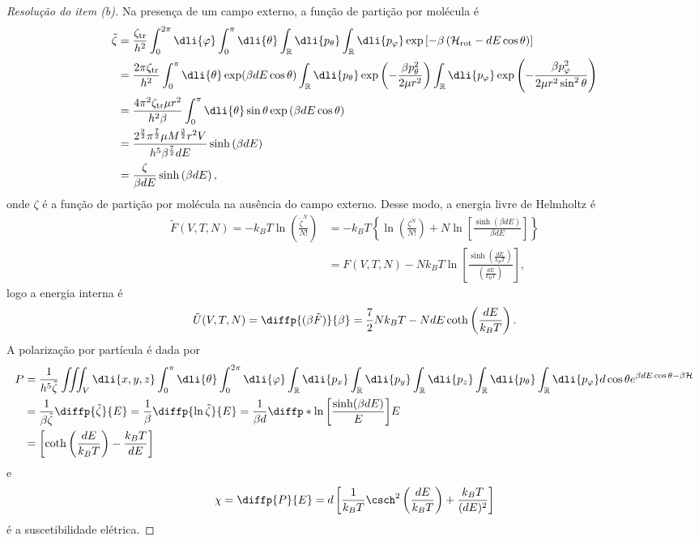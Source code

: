 \begin{proof}[Resolução do item (b)]
    Na presença de um campo externo, a função de partição por molécula é
    \begin{align*}
        \tilde{\zeta} &= \frac{\zeta_{\mathrm{tr}}}{h^2}\int_0^{2\pi} \dli{\varphi} \int_0^\pi \dli{\theta} \int_{\mathbb{R}}\dli{p_\theta} \int_{\mathbb{R}}\dli{p_{\varphi}} \exp\left[-\beta\left(\mathcal{H}_{\mathrm{rot}}-d E \cos\theta\right)\right]\\
              &= \frac{2\pi\zeta_{\mathrm{tr}}}{h^2} \int_0^\pi \dli{\theta} \exp(\beta d E \cos\theta) \int_{\mathbb{R}}\dli{p_\theta} \exp\left(-\frac{\beta p_\theta^2}{2\mu r^2}\right) \int_{\mathbb{R}}\dli{p_{\varphi}}\exp\left(-\frac{\beta p_{\varphi}^2}{2\mu r^2 \sin^2\theta}\right)\\
              &= \frac{4\pi^2 \zeta_{\mathrm{tr}} \mu r^2}{h^2 \beta} \int_0^\pi \dli{\theta} \sin\theta \exp\left(\beta d E \cos\theta\right)\\
              &= \frac{2^{\frac92}\pi^{\frac72} \mu M^{\frac32}r^2V}{h^5 \beta^{\frac72} d E} \sinh\left(\beta d E\right)\\
              &= \frac{\zeta}{\beta dE} \sinh\left(\beta dE\right),
    \end{align*}
    onde \(\zeta\) é a função de partição por molécula na ausência do campo externo. Desse modo, a energia livre de Helmholtz é
    \begin{align*}
        \tilde{F}(V, T, N) = -k_BT \ln \left(\frac{\tilde{\zeta}^N}{N!}\right)
        &= -k_B T \left\{\ln\left(\frac{\zeta^N}{N!}\right) + N\ln\left[\frac{\sinh\left(\beta d E\right)}{\beta d E}\right]\right\}\\
        &= F(V, T, N) - N k_B T\ln\left[\frac{\sinh\left(\frac{d E}{k_BT}\right)}{\left(\frac{d E}{k_B T}\right)}\right],
    \end{align*}
    logo a energia interna é
    \begin{equation*}
        \tilde{U}(V, T, N) = \diffp{(\beta \tilde{F})}{\beta} = \frac72 N k_B T - N d E\coth\left(\frac{dE}{k_BT}\right).
    \end{equation*}
    A polarização por partícula é dada por
    \begin{align*}
        P &= \frac{1}{h^5 \tilde{\zeta}} \iiint_V \dli{x,y,z} \int_0^\pi \dli{\theta}\int_0^{2\pi} \dli{\varphi} \int_{\mathbb{R}} \dli{p_x} \int_{\mathbb{R}} \dli{p_y} \int_{\mathbb{R}} \dli{p_z} \int_{\mathbb{R}} \dli{p_\theta} \int_{\mathbb{R}} \dli{p_{\varphi}} d \cos\theta e^{\beta dE\cos\theta-\beta \mathcal{H}}\\
          &= \frac{1}{\beta \tilde{\zeta}} \diffp{\tilde{\zeta}}{E} = \frac1\beta\diffp{\ln \tilde{\zeta}}{E} = \frac{1}{\beta d} \diffp*{\ln\left[\frac{\sinh( \beta d E)}{E}\right]}{E}\\
          &= \left[\coth\left(\frac{d E}{k_B T}\right) - \frac{k_BT}{d E}\right]
    \end{align*}
    e
    \begin{equation*}
        \chi = \diffp{P}{E} = d\left[\frac{1}{k_BT}\csch^2\left(\frac{dE}{k_BT}\right) + \frac{k_BT}{(dE)^2}\right]
    \end{equation*}
    é a suscetibilidade elétrica.
\end{proof}
